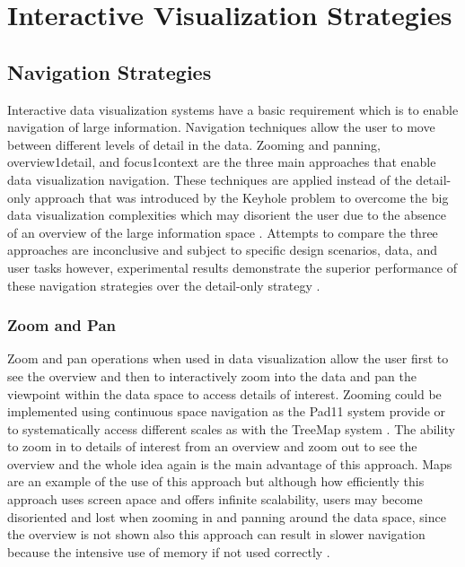 \section{Interactive Visualization Strategies}

\subsection{Navigation Strategies}

Interactive data visualization systems have a basic requirement which is to enable navigation of large information. Navigation techniques allow the user to move between different levels of detail in the data. Zooming and panning, overview1detail, and focus1context are the three main approaches that enable data visualization navigation. These techniques are applied instead of the detail-only approach that was introduced by the Keyhole problem to overcome the big data visualization complexities which may disorient the user due to the absence of an overview of the large information space \cite{salvendy2012handbook}. Attempts to compare the three approaches are inconclusive and subject to specific design scenarios, data, and user tasks however, experimental results demonstrate the superior performance of these navigation strategies over the detail-only strategy \cite{hornbaek2002navigation}.

\subsubsection{Zoom and Pan}

Zoom and pan operations when used in data visualization allow the user first to see the overview and then to interactively zoom into the data and pan the viewpoint within the data space to access details of interest. Zooming could be implemented using continuous space navigation as the Pad11 system \cite{bederson1994pad++} provide or to systematically access different scales as with the TreeMap system \cite{johnson1999tree}. The ability to zoom in to details of interest from an overview and zoom out to see the overview and the whole idea again is the main advantage of this approach. Maps are an example of the use of this approach but although how efficiently this approach uses screen apace and offers infinite scalability, users may become disoriented and lost when zooming in and panning around the data space, since the overview is not shown also this approach can result in slower navigation because the intensive use of memory if not used correctly \cite{salvendy2012handbook}. 

